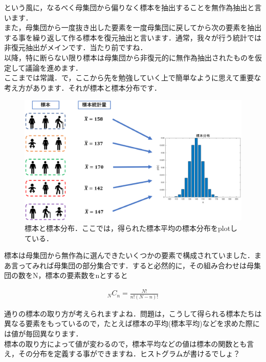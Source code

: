 \documentclass[11pt,a4paper]{ujreport} 	%
\begin{document}
という風に，なるべく母集団から偏りなく標本を抽出することを無作為抽出と言います．\\

また，母集団から一度抜き出した要素を一度母集団に戻してから次の要素を抽出する事を繰り返して作る標本を復元抽出と言います．通常，我々が行う統計では非復元抽出がメインです．当たり前ですね．\\

以降，特に断らない限り標本は母集団から非復元的に無作為抽出されたものを仮定して議論を進めます．\\

ここまでは常識．で，ここから先を勉強していく上で簡単なように思えて重要な考え方があります．それが標本と標本分布です．\\

\begin{figure}[H]
  \centering
  \includegraphics[width=15cm]{../figures/sampling2.eps}
  \caption{標本と標本分布．ここでは，得られた標本平均の標本分布をplotしている．}
\end{figure}

標本は母集団から無作為に選んできたいくつかの要素で構成されていました．まあ言ってみれば母集団の部分集合です．すると必然的に，その組み合わせは母集団の数をN，標本の要素数をnとすると

\begin{align}
  {}_N C_n = \frac{N!}{n!(N-n)!}
\end{align}

通りの標本の取り方が考えられますよね．問題は，こうして得られる標本たちは異なる要素をもっているので，たとえば標本の平均(標本平均)などを求めた際には値が毎回異なります．\\

標本の取り方によって値が変わるので，標本平均などの値は標本の関数とも言え，その分布を定義する事ができますね．ヒストグラムが書けるでしょ？
\end{document}
